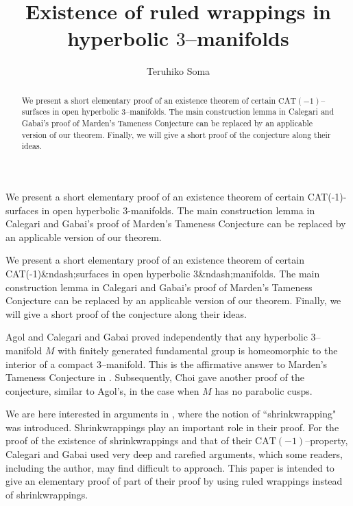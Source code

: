 \documentclass{gtart_a}
\title{Existence of ruled wrappings in hyperbolic $3$--manifolds}
\author{Teruhiko Soma}
\theoremstyle{definition}
\numberwithin{equation}{section}
\begin{document}
\begin{asciiabstract}
We present a short elementary proof of an existence theorem of certain
CAT(-1)-surfaces in open hyperbolic 3-manifolds. The main
construction lemma in Calegari and Gabai's proof of Marden's Tameness
Conjecture can be replaced by an applicable version of our theorem.
\end{asciiabstract}

\begin{htmlabstract}
We present a short elementary proof of an existence theorem of certain
CAT(-1)&ndash;surfaces in open hyperbolic 3&ndash;manifolds.  The
main construction lemma in Calegari and Gabai's proof of Marden's
Tameness Conjecture can be replaced by an applicable version of our
theorem.  Finally, we will give a short proof of the conjecture along
their ideas.
\end{htmlabstract}

\begin{abstract}
We present a short elementary proof of an existence theorem of certain
$\mathrm{CAT}(-1)$--surfaces in open hyperbolic $3$--manifolds.  The
main construction lemma in Calegari and Gabai's proof of Marden's
Tameness Conjecture can be replaced by an applicable version of our
theorem.  Finally, we will give a short proof of the conjecture along
their ideas.
\end{abstract}

\maketitle

Agol \cite{ag} and Calegari and Gabai \cite{cg} proved independently that any hyperbolic $3$--manifold $M$ with finitely 
generated fundamental group is homeomorphic to the interior of a compact $3$--manifold.
This is the affirmative answer to Marden's Tameness Conjecture in \cite{ma}.
Subsequently, Choi \cite{cho} gave another proof of the conjecture, similar to Agol's, in the case when $M$ has no 
parabolic cusps.

We are here interested in arguments in \cite{cg}, where the notion of
``shrinkwrapping" was introduced.  Shrinkwrappings play an important
role in their proof.  For the proof of the existence of
shrinkwrappings and that of their $\mathrm{CAT}(-1)$--property,
Calegari and Gabai used very deep and rarefied arguments, which some
readers, including the author, may find difficult to approach.  This
paper is intended to give an elementary proof of part of their proof
by using ruled wrappings instead of shrinkwrappings.
\end{document}
